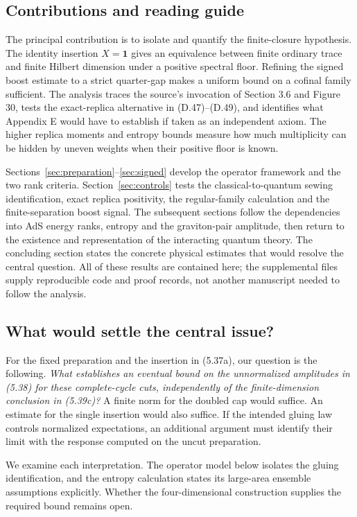 \documentclass[11pt]{article}
\newcommand{\id}{\mathbf{1}}
\begin{document}
\subsection{Contributions and reading guide}
The principal contribution is to isolate and quantify the finite-closure hypothesis. The identity insertion $X=\id$ gives an equivalence between finite ordinary trace and finite Hilbert dimension under a positive spectral floor. Refining the signed boost estimate to a strict quarter-gap makes a uniform bound on a cofinal family sufficient. The analysis traces the source's invocation of Section 3.6 and Figure 30, tests the exact-replica alternative in (D.47)--(D.49), and identifies what Appendix E would have to establish if taken as an independent axiom. The higher replica moments and entropy bounds measure how much multiplicity can be hidden by uneven weights when their positive floor is known.

Sections~\ref{sec:preparation}--\ref{sec:signed} develop the operator framework and the two rank criteria. Section~\ref{sec:controls} tests the classical-to-quantum sewing identification, exact replica positivity, the regular-family calculation and the finite-separation boost signal. The subsequent sections follow the dependencies into AdS energy ranks, entropy and the graviton-pair amplitude, then return to the existence and representation of the interacting quantum theory. The concluding section states the concrete physical estimates that would resolve the central question. All of these results are contained here; the supplemental files supply reproducible code and proof records, not another manuscript needed to follow the analysis.

\subsection{What would settle the central issue?}
For the fixed preparation and the insertion in (5.37a), our question is the following. \emph{What establishes an eventual bound on the unnormalized amplitudes in (5.38) for these complete-cycle cuts, independently of the finite-dimension conclusion in (5.39c)?} A finite norm for the doubled cap would suffice. An estimate for the single insertion would also suffice. If the intended gluing law controls normalized expectations, an additional argument must identify their limit with the response computed on the uncut preparation.

We examine each interpretation. The operator model below isolates the gluing identification, and the entropy calculation states its large-area ensemble assumptions explicitly. Whether the four-dimensional construction supplies the required bound remains open.
\end{document}
